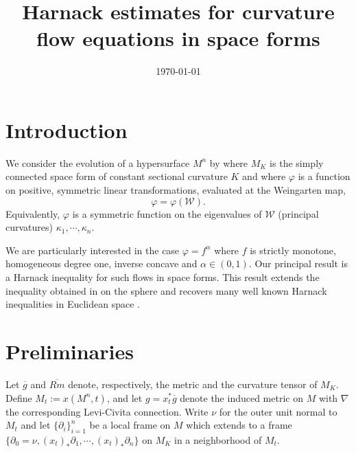 \documentclass{amsart}
\begin{document}
\title[]
 {Harnack estimates for curvature flow equations in space forms}

\curraddr{}
\email{}
\date{\today}

\dedicatory{}
\subjclass[2010]{}
\keywords{}

\begin{abstract}
\end{abstract}

\maketitle

\section{Introduction}

We consider the evolution of a hypersurface $M^n$ by
\eq{\label{Flow}
\partial_tx=-\varphi\nu,~ x:M^n\times[0,T)\to M_K,
}
where \(M_K\) is the simply connected space form of constant sectional curvature \(K\) and where $\varphi$ is a function on positive, symmetric linear transformations, evaluated at the Weingarten map,
\[
\varphi = \varphi(\mathcal{W}).
\]
Equivalently, \(\varphi\) is a symmetric function on the eigenvalues of \(\mathcal{W}\) (principal curvatures) \(\kappa_1, \cdots, \kappa_n\).

We are particularly interested in the case \(\varphi = f^{\alpha}\) where \(f\) is strictly monotone, homogeneous degree one, inverse concave and \(\alpha \in (0,1)\). Our principal result is a Harnack inequality for such flows in space forms. This result extends the inequality obtained in \cite{2015arXiv150802821B, bryanlouie} on the sphere and recovers many well known Harnack inequalities in Euclidean space \cite{MR1296393, MR1100812, MR1316556, MR1480081, MR2813400}.

\section{Preliminaries}

Let $\overline{g}$ and $\overline{Rm}$ denote, respectively, the metric and the curvature tensor of $M_K$. Define \(M_t := x(M^n,t)\), and let \(g = x_t^{\ast} \overline{g}\) denote the induced metric on \(M\) with $\nabla$ the corresponding Levi-Civita connection. Write $\nu$ for the outer unit normal to $M_t$ and let \(\{\partial_i\}_{i=1}^n\) be a local frame on \(M\) which extends to a frame \(\{\partial_0 = \nu, (x_t)_{\ast} \partial_1, \cdots, (x_t)_{\ast} \partial_n\}\) on \(M_K\) in a neighborhood of \(M_t\).
\end{document}
